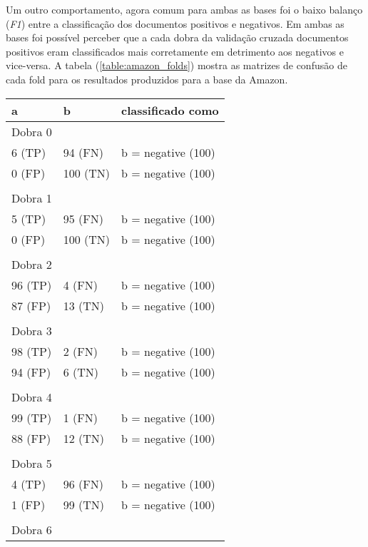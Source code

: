 Um outro comportamento, agora comum para ambas as bases foi o baixo balanço (\textit{F1}) entre a classificação dos documentos positivos e negativos. Em ambas as bases foi possível perceber que a cada dobra da validação cruzada documentos positivos eram classificados mais corretamente em detrimento aos negativos e vice-versa.
A tabela (\ref{table:amazon_folds}) mostra as matrizes de confusão de cada fold para os resultados produzidos para a base da Amazon. 

\begin{table}[!h]
    \begin{tabular}{lll}
    a         					& b                          		& classificado como                                  \\ \hline
	Dobra 0 \\    
    6 (TP)    				&94 (FN)      				& b = negative (100) \\
    0 (FP)    				&100 (TN)      				& b = negative (100) \\
	&&\\
	Dobra 1    \\
    5 (TP)    				&95 (FN)      				& b = negative (100) \\
    0 (FP)    				&100 (TN)      				& b = negative (100) \\
	&&\\ 
	Dobra 2    \\
    96 (TP)    				&4 (FN)      				& b = negative (100) \\
    87 (FP)    				&13 (TN)      				& b = negative (100) \\
	&&\\
    Dobra 3    \\
    98 (TP)    				&2 (FN)      				& b = negative (100) \\
    94 (FP)    				&6 (TN)      				& b = negative (100) \\
	&&\\
	Dobra 4    \\
    99 (TP)    				&1 (FN)      				& b = negative (100) \\
    88 (FP)    				&12 (TN)      				& b = negative (100) \\
	&&\\
	Dobra 5    \\
    4 (TP)    				&96 (FN)      				& b = negative (100) \\
    1 (FP)    				&99 (TN)      				& b = negative (100) \\
	&&\\
	Dobra 6    \\

\end{tabular}
\end{table}
